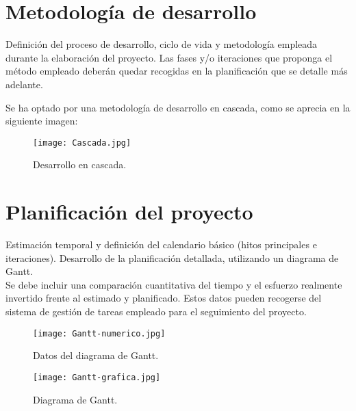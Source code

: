 


\section{Metodología de desarrollo}
Definición del proceso de desarrollo, ciclo de vida y metodología empleada durante la elaboración del proyecto. Las fases y/o iteraciones que proponga el método empleado deberán quedar recogidas en la planificación que se detalle más adelante.

Se ha optado por una metodología de desarrollo en cascada, como se aprecia en la siguiente imagen:

\begin{figure}[h!]
	\centering
	\texttt{[image: Cascada.jpg]}
	\caption{Desarrollo en cascada.}
\end{figure}

\section{Planificación del proyecto}
Estimación temporal y definición del calendario básico (hitos principales e iteraciones). Desarrollo de la planificación detallada, utilizando un diagrama de Gantt.\\

Se debe incluir una comparación cuantitativa del tiempo y el esfuerzo realmente invertido frente al estimado y planificado. Estos datos pueden recogerse del sistema de gestión de tareas empleado para el seguimiento del proyecto.


\begin{figure}[h]
	\centering
	\texttt{[image: Gantt-numerico.jpg]}
	\caption{Datos del diagrama de Gantt.}
\end{figure}

\begin{figure}[h!]
	\centering
	\texttt{[image: Gantt-grafica.jpg]}
	\caption{Diagrama de Gantt.}
\end{figure}


